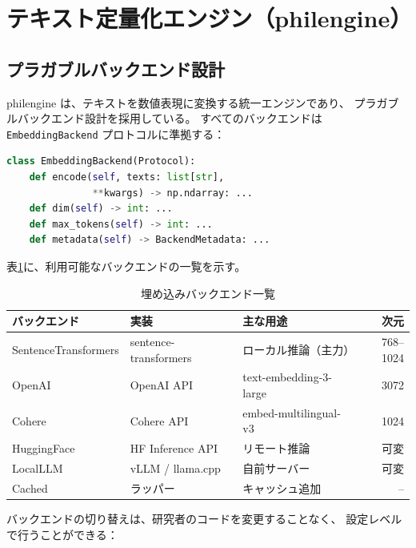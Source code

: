 \documentclass[a4paper,11pt]{ltjsarticle}
\begin{document}
\section{テキスト定量化エンジン（philengine）}\label{sec:engine}

\subsection{プラガブルバックエンド設計}

philengine は、テキストを数値表現に変換する統一エンジンであり、
プラガブルバックエンド設計を採用している。
すべてのバックエンドは \texttt{EmbeddingBackend} プロトコルに準拠する：

\begin{lstlisting}[language=Python,caption=EmbeddingBackend プロトコル]
class EmbeddingBackend(Protocol):
    def encode(self, texts: list[str],
               **kwargs) -> np.ndarray: ...
    def dim(self) -> int: ...
    def max_tokens(self) -> int: ...
    def metadata(self) -> BackendMetadata: ...
\end{lstlisting}

表\ref{tab:backends}に、利用可能なバックエンドの一覧を示す。

\begin{table}[H]
\centering
\caption{埋め込みバックエンド一覧}
\label{tab:backends}
\small
\begin{tabular}{lllr}
\toprule
\textbf{バックエンド} & \textbf{実装} & \textbf{主な用途} & \textbf{次元} \\
\midrule
SentenceTransformers & sentence-transformers & ローカル推論（主力） & 768--1024 \\
OpenAI & OpenAI API & text-embedding-3-large & 3072 \\
Cohere & Cohere API & embed-multilingual-v3 & 1024 \\
HuggingFace & HF Inference API & リモート推論 & 可変 \\
LocalLLM & vLLM / llama.cpp & 自前サーバー & 可変 \\
Cached & ラッパー & キャッシュ追加 & -- \\
\bottomrule
\end{tabular}
\end{table}

バックエンドの切り替えは、研究者のコードを変更することなく、
設定レベルで行うことができる：
\end{document}
